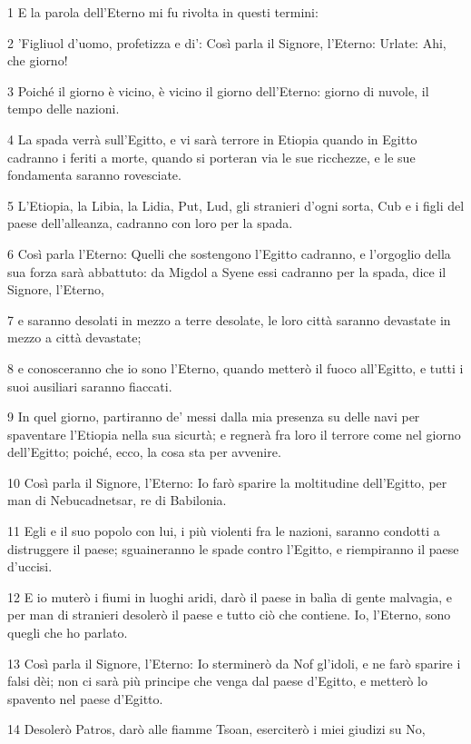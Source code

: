 \par 1 E la parola dell'Eterno mi fu rivolta in questi termini:
\par 2 'Figliuol d'uomo, profetizza e di': Così parla il Signore, l'Eterno: Urlate: Ahi, che giorno!
\par 3 Poiché il giorno è vicino, è vicino il giorno dell'Eterno: giorno di nuvole, il tempo delle nazioni.
\par 4 La spada verrà sull'Egitto, e vi sarà terrore in Etiopia quando in Egitto cadranno i feriti a morte, quando si porteran via le sue ricchezze, e le sue fondamenta saranno rovesciate.
\par 5 L'Etiopia, la Libia, la Lidia, Put, Lud, gli stranieri d'ogni sorta, Cub e i figli del paese dell'alleanza, cadranno con loro per la spada.
\par 6 Così parla l'Eterno: Quelli che sostengono l'Egitto cadranno, e l'orgoglio della sua forza sarà abbattuto: da Migdol a Syene essi cadranno per la spada, dice il Signore, l'Eterno,
\par 7 e saranno desolati in mezzo a terre desolate, le loro città saranno devastate in mezzo a città devastate;
\par 8 e conosceranno che io sono l'Eterno, quando metterò il fuoco all'Egitto, e tutti i suoi ausiliari saranno fiaccati.
\par 9 In quel giorno, partiranno de' messi dalla mia presenza su delle navi per spaventare l'Etiopia nella sua sicurtà; e regnerà fra loro il terrore come nel giorno dell'Egitto; poiché, ecco, la cosa sta per avvenire.
\par 10 Così parla il Signore, l'Eterno: Io farò sparire la moltitudine dell'Egitto, per man di Nebucadnetsar, re di Babilonia.
\par 11 Egli e il suo popolo con lui, i più violenti fra le nazioni, saranno condotti a distruggere il paese; sguaineranno le spade contro l'Egitto, e riempiranno il paese d'uccisi.
\par 12 E io muterò i fiumi in luoghi aridi, darò il paese in balìa di gente malvagia, e per man di stranieri desolerò il paese e tutto ciò che contiene. Io, l'Eterno, sono quegli che ho parlato.
\par 13 Così parla il Signore, l'Eterno: Io sterminerò da Nof gl'idoli, e ne farò sparire i falsi dèi; non ci sarà più principe che venga dal paese d'Egitto, e metterò lo spavento nel paese d'Egitto.
\par 14 Desolerò Patros, darò alle fiamme Tsoan, eserciterò i miei giudizi su No,
